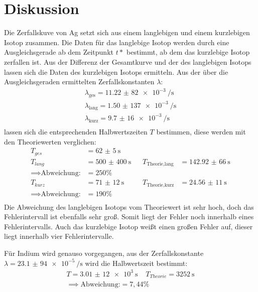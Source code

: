 \section{Diskussion}
\label{sec:Diskussion}
Die Zerfallskuve von Ag setzt sich aus einem langlebigen und einem kurzlebigen
Isotop zusammen. Die Daten für das langlebige Isotop werden durch eine Ausgleichsgerade
ab dem Zeitpunkt $t*$ bestimmt, ab dem das kurzlebige Isotop zerfallen ist.
Aus der Differenz der Gesamtkurve und der des langlebigen Isotops lassen sich die
Daten des kurzlebigen Isotops ermitteln.
Aus der über die Ausgleichsgeraden ermittelten Zerfallskonstanten $\lambda$:
\begin{align*}
  \lambda_{\text{ges}}=\SI{11,22(82)e-3}{\per\s}\\
  \lambda_{\text{lang}}=\SI{1,50(137)e-3}{\per\s}\\
  \lambda_{\text{kurz}}=\SI{9,7(16)e-3}{\per\s}\\
\end{align*}
lassen sich die
entsprechenden Halbwertszeiten $T$ bestimmen, diese werden mit den Theoriewerten verglichen:
\begin{align*}
  T_{ges}&=\SI{62(5)}{\s}\\
  T_{lang}&=\SI{500(400)}{\s}\;\;\;&T_{\text{Theorie,lang}}&=\SI{142,92(66)}{\s}\\
  \implies \text{Abweichung:}&=250\%\\
  T_{kurz}&=\SI{71(12)}{\s}\;\;\;&T_{\text{Theorie,kurz}}&=\SI{24,56(11)}{\s}\\
  \implies \text{Abweichung:}&=190\%\\
\end{align*}
\cite{silber}
Die Abweichung des langlebigen Isotops vom Theoriewert ist sehr hoch, doch das
Fehlerintervall ist ebenfalls sehr groß. Somit liegt der Fehler noch innerhalb eines Fehlerintervalls.
Auch das kurzlebige Isotop weißt einen großen Fehler auf, dieser liegt innerhalb vier
Fehlerintervalle.

Für Indium wird genauso vorgegangen, aus der Zerfallskonstante $\lambda =\SI{23,1(94)e-5}{\per\s}$
wird die Halbwertszeit
bestimmt:
\begin{align*}
  T=\SI{3,01(12)e+3}{\s}\;\;\;\;T_{Theorie}=\SI{3252}{\s}\\
  \implies \text{Abweichung:}=7,44\%\\
\end{align*}
\cite{indium}
